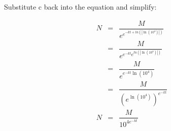 Substitute c back into the equation and simplify:

\begin{eqnarray*}
N &=& \dfrac{M}{e^{e^{-kt + ln\left(\left|\ln\left({10^4}\right)\right|\right)}}} \\
  &=& \dfrac{M}{e^{e^{-kt} e^{ln\left(\left|\ln\left({10^4}\right)\right|\right)}}} \\
  &=& \dfrac{M}{e^{e^{-kt} \ln\left({10^4}\right)}} \\
  &=& \dfrac{M}{(e^{\ln\left({10^4}\right)})^{e^{-kt}}} \\
N  &=& \dfrac{M}{10^{4e^{-kt}}}
\end{eqnarray*}

\clearpage